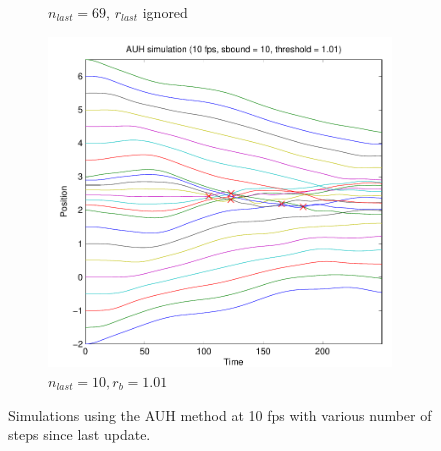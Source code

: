 \documentclass[11pt]{article}
\begin{document}
\begin{figure}[H]
\begin{subfigure}[t]{0.5\textwidth}
        \caption{$n_{last} = 69$, $r_{last}$ ignored}
        \label{fig:atomic_multi_69sbound}
    \end{subfigure}
    \begin{subfigure}[t]{0.5\textwidth}
        \includegraphics[width=\textwidth]{../images/atomic_multiscale_10fps_both.pdf}
        \caption{$n_{last} = 10, r_{b} = 1.01$}
        \label{fig:atomic_multi_both}
    \end{subfigure}
    \caption{Simulations using the AUH method at 10 fps with various number of
    steps since last update.}
    \label{fig:atomic_multi_sbound}
\end{figure}
\end{document}
